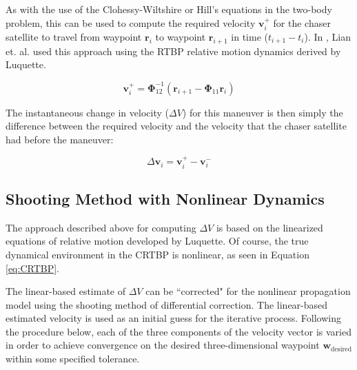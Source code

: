 \documentclass[a4paper]{article}
\begin{document}
As with the use of the Clohessy-Wiltshire or Hill's equations in the two-body problem, this can be used to compute the required velocity \(\mathbf{v}_i^+\) for the chaser satellite to travel from waypoint \(\mathbf{r}_i\) to waypoint \(\mathbf{r}_{i+1}\) in time (\(t_{i+1} - t_i\)).  In  \cite{lian2011}, Lian et. al. used this approach using the RTBP relative motion dynamics derived by Luquette.  %


\begin{equation} \label{eq:RequiredVelocity}
\mathbf{v}_i^+ = \boldsymbol{\Phi}_{12}^{-1}(\mathbf{r}_{i+1} - \boldsymbol{\Phi}_{11}\mathbf{r}_i)
\end{equation}

The instantaneous change in velocity (\(\Delta V\)) for this maneuver is then simply the difference between the required velocity and the velocity that the chaser satellite had before the maneuver:

\begin{equation} \label{eq:DeltaV}
\Delta \mathbf{v}_i = \mathbf{v}_i^+ - \mathbf{v}_i^-
\end{equation}

\subsection{Shooting Method with Nonlinear Dynamics} \label{sec:shooting}

The approach described above for computing \(\Delta V\) is based on the linearized equations of relative motion developed by Luquette.  Of course, the true dynamical environment in the CRTBP is nonlinear, as seen in Equation \ref{eq:CRTBP}.

The linear-based estimate of \(\Delta V\) can be ``corrected" for the nonlinear propagation model using the shooting method of differential correction.  The linear-based estimated velocity is used as an initial guess for the iterative process.  Following the procedure below, each of the three components of the velocity vector is varied in order to achieve convergence on the desired three-dimensional waypoint \(\mathbf{w}_{\mathrm{desired}}\) within some specified tolerance.
\end{document}
